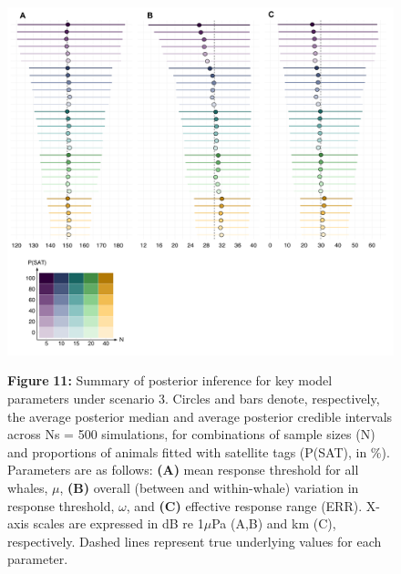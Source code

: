 \documentclass[
]{article}
\begin{document}
\begin{figure}

{\centering \includegraphics[width=1.05\linewidth]{fig/fig_forestplot_S3} 

}

\textbf{Figure }{\textbf{11:} \hypertarget{fig11}{}Summary of posterior inference for key model parameters under scenario 3. Circles and bars denote, respectively, the average posterior median and average posterior credible intervals across Ns = 500 simulations, for combinations of sample sizes (N) and proportions of animals fitted with satellite tags (P(SAT), in \%). Parameters are as follows: \textbf{(A)} mean response threshold for all whales, \(\mu\), \textbf{(B)} overall (between and within-whale) variation in response threshold, \(\omega\), and \textbf{(C)} effective response range (ERR). X-axis scales are expressed in dB re 1\(\mu\)Pa (A,B) and km (C), respectively. Dashed lines represent true underlying values for each parameter.}\label{fig:unnamed-chunk-10}
\end{figure}
\end{document}
